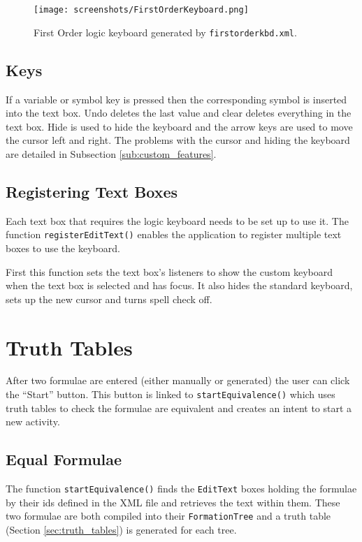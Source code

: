 \documentclass[draft]{report}
\begin{document}
\begin{figure}[ht!]
    \centering
    \texttt{[image: screenshots/FirstOrderKeyboard.png]}
    \caption{First Order logic keyboard generated by {\tt firstorderkbd.xml}.}
    \label{firstorderkeyboard}
\end{figure}

\subsection{Keys}

If a variable or symbol key is pressed then the corresponding symbol is inserted into the text box. Undo deletes the last value and clear deletes everything in the text box. Hide is used to hide the keyboard and the arrow keys are used to move the cursor left and right. The problems with the cursor and hiding the keyboard are detailed in Subsection \ref{sub:custom_features}.

\subsection{Registering Text Boxes}

Each text box that requires the logic keyboard needs to be set up to use it. The function {\tt registerEditText()} enables the application to register multiple text boxes to use the keyboard.

First this function sets the text box's listeners to show the custom keyboard when the text box is selected and has focus. It also hides the standard keyboard, sets up the new cursor and turns spell check off.

\section{Truth Tables}
\label{sec:app_truth_tables}

After two formulae are entered (either manually or generated) the user can click the ``Start'' button. This button is linked to {\tt startEquivalence()} which uses truth tables to check the formulae are equivalent and creates an intent to start a new activity.

\subsection{Equal Formulae}
\label{sub:equal_equivalences}

The function {\tt startEquivalence()} finds the {\tt EditText} boxes holding the formulae by their ids defined in the XML file and retrieves the text within them. These two formulae are both compiled into their {\tt FormationTree} and a truth table (Section \ref{sec:truth_tables}) is generated for each tree. 
\end{document}
